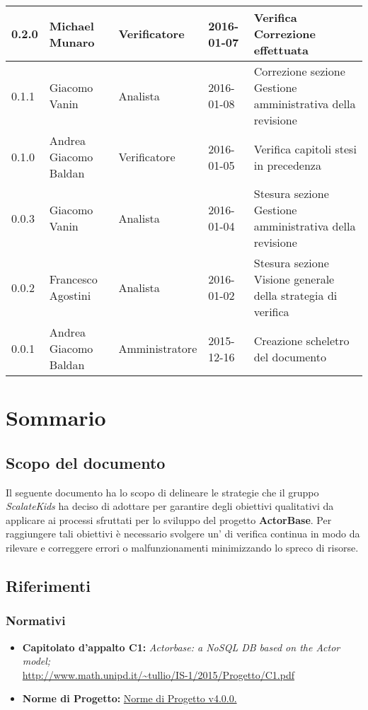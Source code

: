 \documentclass{scalatekids-article}
\begin{document}
\begin{center}
\begin{longtable}{| l | l | l | l | p{5cm} |}
    \hline
    0.2.0 & Michael Munaro & Verificatore & 2016-01-07 & Verifica Correzione effettuata\\
    \hline
    0.1.1 & Giacomo Vanin & Analista & 2016-01-08 & Correzione sezione Gestione amministrativa della revisione\\
    \hline
    0.1.0 & Andrea Giacomo Baldan & Verificatore & 2016-01-05 & Verifica capitoli stesi in precedenza\\
    \hline
    0.0.3 & Giacomo Vanin & Analista & 2016-01-04 & Stesura sezione Gestione amministrativa della revisione\\
    \hline
    0.0.2 & Francesco Agostini & Analista & 2016-01-02 & Stesura sezione Visione generale della strategia di verifica\\
    \hline
    0.0.1 & Andrea Giacomo Baldan & Amministratore & 2015-12-16 & Creazione scheletro del documento\\
    \hline
  \end{longtable}
\end{center}
\tableofcontents
\newpage
{}
\section{Sommario}
\subsection{Scopo del documento}
Il seguente documento ha lo scopo di delineare le strategie che il gruppo \textit{ScalateKids} ha deciso di adottare per garantire degli obiettivi qualitativi da applicare ai processi sfruttati per lo sviluppo del progetto \textbf{ActorBase}. Per raggiungere tali obiettivi è necessario svolgere un' di verifica continua in modo da rilevare e correggere errori o malfunzionamenti minimizzando lo spreco di risorse.
\prodPurpose
\glossExpl
\subsection{Riferimenti}
\subsubsection{Normativi}
\begin{itemize}
\item\textbf{Capitolato d'appalto C1:} \textit{Actorbase: a NoSQL DB based on the Actor model;}\\
  \url{http://www.math.unipd.it/~tullio/IS-1/2015/Progetto/C1.pdf}
\item\textbf{Norme di Progetto:} \href{run:../Interni/NormeDiProgetto\_v4.0.0.pdf}{Norme di Progetto v4.0.0.}
\end{itemize}
\end{document}
